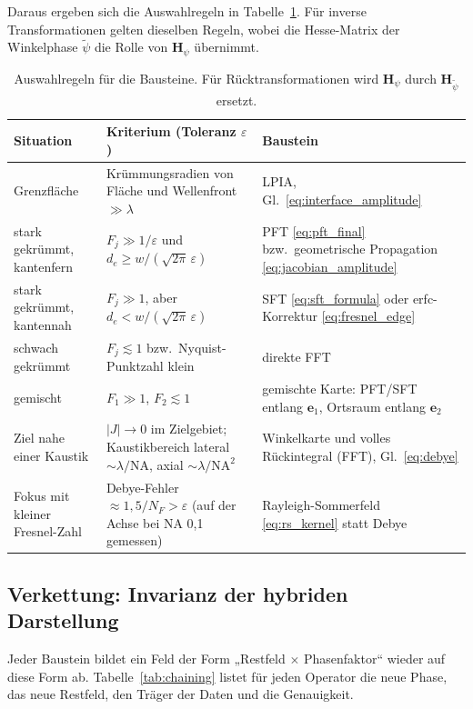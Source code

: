\documentclass[11pt,a4paper]{scrartcl}
\theoremstyle{insightstyle}
\newcommand{\Hess}{\bm{H}}
\newcommand{\NA}{\mathrm{NA}}
\begin{document}
Daraus ergeben sich die Auswahlregeln in Tabelle~\ref{tab:selection}. Für inverse Transformationen gelten dieselben Regeln, wobei die Hesse-Matrix der Winkelphase $\tilde\psi$ die Rolle von $\Hess_\psi$ übernimmt.

\begin{table}[htbp]
\centering
\renewcommand{\arraystretch}{1.3}
\small
\begin{tabularx}{\textwidth}{>{\raggedright\arraybackslash}p{3.6cm} >{\raggedright\arraybackslash}X >{\raggedright\arraybackslash}p{4.6cm}}
\toprule
Situation & Kriterium (Toleranz $\varepsilon$) & Baustein\\
\midrule
Grenzfläche & Krümmungsradien von Fläche und Wellenfront $\gg\lambda$ & LPIA, Gl.~\eqref{eq:interface_amplitude}\\
\addlinespace
stark gekrümmt, kantenfern & $F_j\gg1/\varepsilon$ und $d_e\ge w/(\sqrt{2\pi}\,\varepsilon)$ & PFT \eqref{eq:pft_final} bzw.\ geometrische Propagation \eqref{eq:jacobian_amplitude}\\
\addlinespace
stark gekrümmt, kantennah & $F_j\gg1$, aber $d_e< w/(\sqrt{2\pi}\,\varepsilon)$ & SFT \eqref{eq:sft_formula} oder erfc-Korrektur \eqref{eq:fresnel_edge}\\
\addlinespace
schwach gekrümmt & $F_j\lesssim1$ bzw.\ Nyquist-Punktzahl klein & direkte FFT\\
\addlinespace
gemischt & $F_1\gg1$, $F_2\lesssim1$ & gemischte Karte: PFT/SFT entlang $\bm e_1$, Ortsraum entlang $\bm e_2$\\
\addlinespace
Ziel nahe einer Kaustik & $|J|\to0$ im Zielgebiet; Kaustikbereich lateral $\sim\lambda/\NA$, axial $\sim\lambda/\NA^2$ & Winkelkarte und volles Rückintegral (FFT), Gl.~\eqref{eq:debye}\\
\addlinespace
Fokus mit kleiner Fresnel-Zahl & Debye-Fehler $\approx1{,}5/N_F>\varepsilon$ (auf der Achse bei NA 0,1 gemessen) & Rayleigh-Sommerfeld \eqref{eq:rs_kernel} statt Debye\\
\bottomrule
\end{tabularx}
\caption{Auswahlregeln für die Bausteine. Für Rücktransformationen wird $\Hess_\psi$ durch $\Hess_{\tilde\psi}$ ersetzt.}
\label{tab:selection}
\end{table}

\subsection{Verkettung: Invarianz der hybriden Darstellung}\label{sec:chaining}
Jeder Baustein bildet ein Feld der Form „Restfeld $\times$ Phasenfaktor“ wieder auf diese Form ab. Tabelle~\ref{tab:chaining} listet für jeden Operator die neue Phase, das neue Restfeld, den Träger der Daten und die Genauigkeit.
\end{document}
